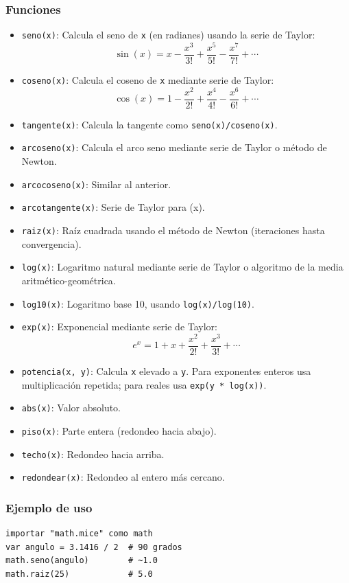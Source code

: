 \documentclass[12pt]{article}
\begin{document}
\subsubsection*{Funciones}
\begin{itemize}
    \item \texttt{seno(x)}: Calcula el seno de \texttt{x} (en radianes) usando la serie de Taylor: 
    \[ \sin(x) = x - \frac{x^3}{3!} + \frac{x^5}{5!} - \frac{x^7}{7!} + \cdots \]
    \item \texttt{coseno(x)}: Calcula el coseno de \texttt{x} mediante serie de Taylor:
    \[ \cos(x) = 1 - \frac{x^2}{2!} + \frac{x^4}{4!} - \frac{x^6}{6!} + \cdots \]
    \item \texttt{tangente(x)}: Calcula la tangente como \texttt{seno(x)/coseno(x)}.
    \item \texttt{arcoseno(x)}: Calcula el arco seno mediante serie de Taylor o método de Newton.
    \item \texttt{arcocoseno(x)}: Similar al anterior.
    \item \texttt{arcotangente(x)}: Serie de Taylor para \arctan(x).
    \item \texttt{raiz(x)}: Raíz cuadrada usando el método de Newton (iteraciones hasta convergencia).
    \item \texttt{log(x)}: Logaritmo natural mediante serie de Taylor o algoritmo de la media aritmético-geométrica.
    \item \texttt{log10(x)}: Logaritmo base 10, usando \texttt{log(x)/log(10)}.
    \item \texttt{exp(x)}: Exponencial mediante serie de Taylor: 
    \[ e^x = 1 + x + \frac{x^2}{2!} + \frac{x^3}{3!} + \cdots \]
    \item \texttt{potencia(x, y)}: Calcula \texttt{x} elevado a \texttt{y}. Para exponentes enteros usa multiplicación repetida; para reales usa \texttt{exp(y * log(x))}.
    \item \texttt{abs(x)}: Valor absoluto.
    \item \texttt{piso(x)}: Parte entera (redondeo hacia abajo).
    \item \texttt{techo(x)}: Redondeo hacia arriba.
    \item \texttt{redondear(x)}: Redondeo al entero más cercano.
\end{itemize}

\subsubsection*{Ejemplo de uso}
\begin{lstlisting}
importar "math.mice" como math
var angulo = 3.1416 / 2  # 90 grados
math.seno(angulo)        # ~1.0
math.raiz(25)            # 5.0
\end{lstlisting}
\end{document}
